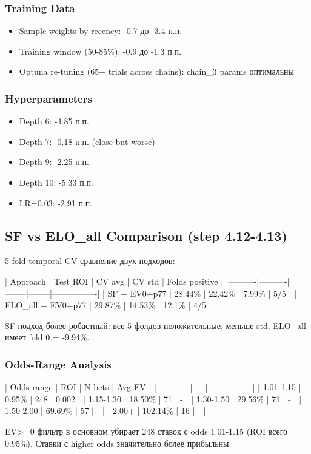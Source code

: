 \documentclass[12pt,a4paper]{article}
\begin{document}
\subsubsection{Training Data}
\begin{itemize}
  \item Sample weights by recency: -0.7 до -3.4 п.п.
  \item Training window (50-85\%): -0.9 до -1.3 п.п.
  \item Optuna re-tuning (65+ trials across chains): chain\_3 params оптимальны
\end{itemize}

\subsubsection{Hyperparameters}
\begin{itemize}
  \item Depth 6: -4.85 п.п.
  \item Depth 7: -0.18 п.п. (close but worse)
  \item Depth 9: -2.25 п.п.
  \item Depth 10: -5.33 п.п.
  \item LR=0.03: -2.91 п.п.
\end{itemize}

\subsection{SF vs ELO\_all Comparison (step 4.12-4.13)}

5-fold temporal CV сравнение двух подходов:

| Approach | Test ROI | CV avg | CV std | Folds positive |
|----------|----------|--------|--------|----------------|
| SF + EV0+p77 | 28.44\% | 22.42\% | 7.99\% | 5/5 |
| ELO\_all + EV0+p77 | 29.87\% | 14.53\% | 12.1\% | 4/5 |

SF подход более робастный: все 5 фолдов положительные, меньше std. ELO\_all имеет fold 0 = -9.94\%.

\subsubsection{Odds-Range Analysis}
| Odds range | ROI | N bets | Avg EV |
|------------|-----|--------|--------|
| 1.01-1.15 | 0.95\% | 248 | 0.002 |
| 1.15-1.30 | 18.50\% | 71 | - |
| 1.30-1.50 | 29.56\% | 71 | - |
| 1.50-2.00 | 69.69\% | 57 | - |
| 2.00+ | 102.14\% | 16 | - |

EV>=0 фильтр в основном убирает 248 ставок с odds 1.01-1.15 (ROI всего 0.95\%). Ставки с higher odds значительно более прибыльны.
\end{document}
